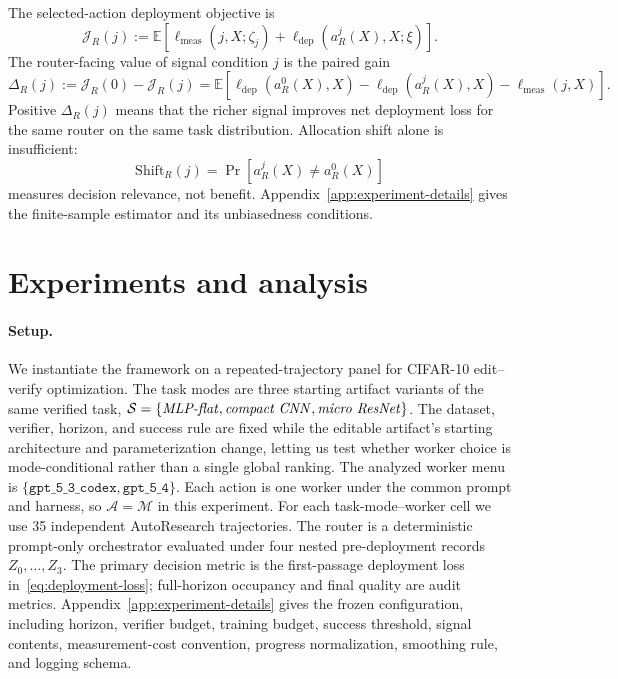 \documentclass{article}
\newcommand{\cA}{\mathcal{A}}
\newcommand{\cM}{\mathcal{M}}
\newcommand{\cS}{\mathcal{S}}
\newcommand{\E}{\mathbb{E}}
\newcommand{\J}{\mathcal{J}}
\begin{document}
The selected-action deployment objective is
\begin{equation}
    \J_R(j)
    :=
    \E\left[
        \ell_{\mathrm{meas}}(j,X;\zeta_j)
        +
        \ell_{\mathrm{dep}}(a_R^j(X),X;\xi)
    \right].
\label{eq:router-objective}
\end{equation}
The router-facing value of signal condition \(j\) is the paired gain
\begin{equation}
\Delta_R(j)
:=
\J_R(0)-\J_R(j)
=
\E\!\left[
    \ell_{\mathrm{dep}}(a_R^0(X),X)
    -
    \ell_{\mathrm{dep}}(a_R^j(X),X)
    -
    \ell_{\mathrm{meas}}(j,X)
\right].
\label{eq:router-gain}
\end{equation}
Positive \(\Delta_R(j)\) means that the richer signal improves net deployment loss for the
same router on the same task distribution.  Allocation shift alone is insufficient:
\[
    \mathrm{Shift}_R(j)
    =
    \Pr[a_R^j(X)\neq a_R^0(X)]
\]
measures decision relevance, not benefit.
Appendix~\ref{app:experiment-details} gives the finite-sample estimator and its
unbiasedness conditions.


\section{Experiments and analysis}
\label{sec:experiments}

\paragraph{Setup.}
We instantiate the framework on a repeated-trajectory panel for CIFAR-10 edit--verify optimization.
The task modes are three starting artifact variants of the same verified task, \(\cS=\{\text{\textit{MLP-flat}},\text{\textit{compact CNN}},\text{\textit{micro ResNet}}\}\).
The dataset, verifier, horizon, and success rule are fixed while the editable artifact's starting architecture and parameterization change, letting us test whether worker choice is mode-conditional rather than a single global ranking.
The analyzed worker menu is \(\{\texttt{gpt\_5\_3\_codex},\texttt{gpt\_5\_4}\}\).
Each action is one worker under the common prompt and harness, so \(\cA=\cM\) in this experiment.
For each task-mode--worker cell we use 35 independent AutoResearch trajectories.
The router is a deterministic prompt-only orchestrator evaluated under four nested pre-deployment records \(Z_0,\ldots,Z_3\). 
The primary decision metric is the first-passage deployment loss in~\eqref{eq:deployment-loss}; full-horizon occupancy and final quality are audit metrics.
Appendix~\ref{app:experiment-details} gives the frozen configuration, including horizon, verifier budget, training budget, success threshold, signal contents, measurement-cost convention, progress normalization, smoothing rule, and logging schema.
\end{document}
